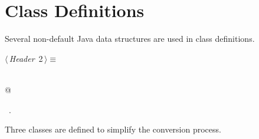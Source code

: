 \documentclass[a4paper]{report}
\begin{document}
\section{Class Definitions}

Several non-default Java data structures are used in class definitions.
\begin{flushleft} \small
\begin{minipage}{\linewidth}\label{scrap2}\raggedright\small
{} $\langle\,${\itshape Header}\nobreak\ {\footnotesize {2}}$\,\rangle\equiv$
\vspace{-1ex}
\begin{list}{}{} \item
\mbox{}\verb@@\\
\mbox{}@\\
\mbox{}\verb@@{\NWsep}
\end{list}
\vspace{-1.5ex}
\footnotesize
\begin{list}{}{\setlength{\itemsep}{-\parsep}\setlength{\itemindent}{-\leftmargin}}
\item \NWtxtMacroRefIn\ .

\item{}
\end{list}
\end{minipage}\vspace{4ex}
\end{flushleft}
Three classes are defined to simplify the conversion process.
\end{document}
